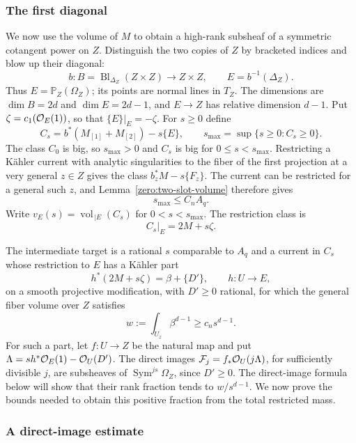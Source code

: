 \subsubsection{The first diagonal}

We now use the volume of \(M\) to obtain a high-rank subsheaf of a
symmetric cotangent power on \(Z\).  Distinguish the two copies of \(Z\)
by bracketed indices and
blow up their diagonal:
\[
 b:B=\operatorname{Bl}_{\Delta_Z}(Z\times Z)\longrightarrow Z\times Z,\qquad
 E=b^{-1}(\Delta_Z).
\]
Thus \(E=\mathbb{P}_Z(\Omega_Z)\); its points are normal lines in \(T_Z\).
The dimensions are \(\dim B=2d\) and \(\dim E=2d-1\), and
\(E\to Z\) has relative dimension \(d-1\).
Put \(\zeta=c_1(\mathcal O_E(1))\), so that \(\{E\}|_E=-\zeta\).
For \(s\ge0\) define
\[
 C_s=b^*(M_{[1]}+M_{[2]})-s\{E\},\qquad
 s_{\max}=\sup\{s\ge0:C_s\ge0\}.
\]
The class \(C_0\) is big, so \(s_{\max}>0\) and \(C_s\) is big for
\(0\le s<s_{\max}\).  Restricting a Kähler current with analytic
singularities to the fiber of the first projection at a very general
\(z\in Z\) gives the class \(b_z^*M-s\{F_z\}\).  The current can be
restricted for a general such \(z\), and Lemma~\ref{zero:two-slot-volume}
therefore gives
\begin{equation}\label{zero:smax}
 s_{\max}\le C_nA_q .
\end{equation}
Write \(v_E(s)=\operatorname{vol}_{\,|E}(C_s)\) for
\(0<s<s_{\max}\).  The restriction class is
\begin{equation}\label{zero:restriction-class}
 C_s|_E=2M+s\zeta .
\end{equation}

The intermediate target is a rational \(s\) comparable to \(A_q\) and
a current in \(C_s\) whose restriction to \(E\) has a Kähler part
\[
 h^*(2M+s\zeta)=\beta+\{D'\},\qquad
 h:U\longrightarrow E,
\]
on a smooth projective modification, with \(D'\ge0\) rational, for
which the general fiber volume over \(Z\) satisfies
\[
 w:=\int_{U_z}\beta^{d-1}\ge c_ns^{d-1}.
\]
For such a part, let \(f:U\to Z\) be the natural map and put
\(\Lambda=s h^*\mathcal O_E(1)-\mathcal O_U(D')\).  The direct images
\(\mathcal F_j=f_*\mathcal O_U(j\Lambda)\), for sufficiently divisible \(j\),
are subsheaves of \(\operatorname{Sym}^{js}\Omega_Z\), since \(D'\ge0\).
The direct-image formula below will show that their rank fraction tends
to \(w/s^{d-1}\).  We now prove the bounds needed to obtain this positive
fraction from the total restricted mass.

\subsubsection{A direct-image estimate}

